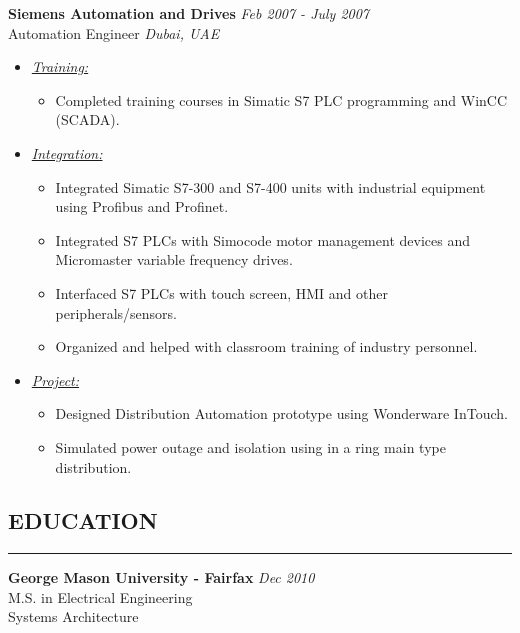 \documentclass{article}
\begin{document}
    {\bf Siemens Automation and Drives} \hfill {\em Feb 2007 - July 2007} \\
    Automation Engineer \hfill {\em Dubai, UAE} \\
    \begin{itemize}
    \item \underline{\it Training:}
          \begin{itemize}
          \item Completed training courses in Simatic S7 PLC programming and
                WinCC (SCADA).
          \end{itemize}
    \item \underline{\it Integration:}
          \begin{itemize}
          \item Integrated Simatic S7-300 and S7-400 units with industrial
                equipment using Profibus and Profinet.
          \item Integrated S7 PLCs with Simocode motor management devices and
                Micromaster variable frequency drives.
          \item Interfaced S7 PLCs with touch screen, HMI and other
                peripherals/sensors.
          \item Organized and helped with classroom training of industry
                personnel.
          \end{itemize}
    \item \underline{\it Project:}
          \begin{itemize}
          \item Designed Distribution Automation prototype using Wonderware
                InTouch.
          \item Simulated power outage and isolation using in a ring main type
                distribution.
          \end{itemize}
    \end{itemize}
    \bigskip

%
\subsection*{\MakeUppercase{\bf Education}}
    \hrule
    \bigskip
    {\bf George Mason University - Fairfax} \hfill {\em Dec 2010} \\ 
    M.S. in Electrical Engineering \\
    Systems Architecture \bigskip \\
\end{document}

